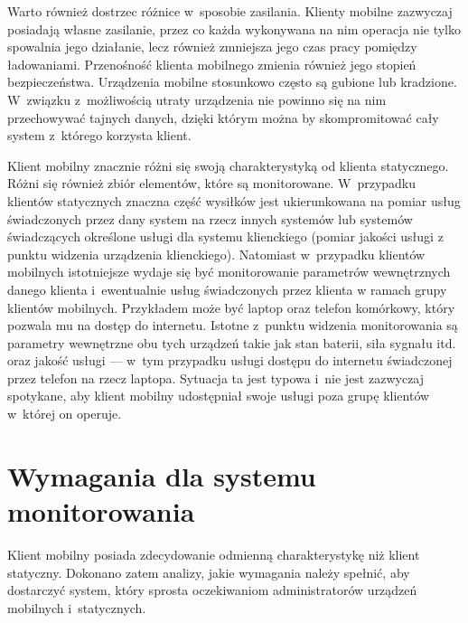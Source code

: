 Warto również dostrzec różnice w~sposobie zasilania. Klienty mobilne
zazwyczaj posiadają własne zasilanie, przez co każda wykonywana na nim
operacja nie tylko spowalnia jego działanie, lecz również zmniejsza
jego czas pracy pomiędzy ładowaniami. Przenośność klienta mobilnego
zmienia również jego stopień bezpieczeństwa. Urządzenia mobilne
stosunkowo często są gubione lub kradzione. W~związku z~możliwością
utraty urządzenia nie powinno się na nim przechowywać tajnych danych,
dzięki którym można by skompromitować cały system z~którego korzysta
klient.

Klient mobilny znacznie różni się swoją charakterystyką od klienta
statycznego. Różni się również zbiór elementów, które są
monitorowane. W~przypadku klientów statycznych znaczna część wysiłków
jest ukierunkowana na pomiar usług świadczonych przez dany system na
rzecz innych systemów lub systemów świadczących określone usługi dla
systemu klienckiego (pomiar jakości usługi z punktu widzenia
urządzenia klienckiego). Natomiast w~przypadku klientów mobilnych
istotniejsze wydaje się być monitorowanie parametrów wewnętrznych
danego klienta i~ewentualnie usług świadczonych przez klienta w ramach
grupy klientów mobilnych. Przykładem może być laptop oraz telefon
komórkowy, który pozwala mu na dostęp do internetu. Istotne z~punktu
widzenia monitorowania są parametry wewnętrzne obu tych urządzeń takie
jak stan baterii, siła sygnału itd. oraz jakość usługi --- w~tym
przypadku usługi dostępu do internetu świadczonej przez telefon na
rzecz laptopa. Sytuacja ta jest typowa i~nie jest zazwyczaj spotykane,
aby klient mobilny udostępniał swoje usługi poza grupę klientów
w~której on operuje.

\section[Wymagania][Wymagania dla systemu monitorowania]{Wymagania dla systemu monitorowania}

Klient mobilny posiada zdecydowanie odmienną charakterystykę niż
klient statyczny. Dokonano zatem analizy, jakie wymagania należy
spełnić, aby dostarczyć system, który sprosta oczekiwaniom
administratorów urządzeń mobilnych i~statycznych.

